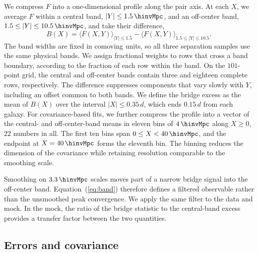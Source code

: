 We compress $F$ into a one-dimensional profile along the pair axis. At each
$X$, we average $F$ within a central band, $|Y|\leq1.5\,\hinvMpc$, and an
off-center band, $1.5\leq|Y|\leq10.5\,\hinvMpc$, and take their difference,
\begin{equation}
  B(X) = \langle F(X,Y)\rangle_{|Y|\leq1.5}
       - \langle F(X,Y)\rangle_{1.5\leq|Y|\leq10.5}.
  \label{eq:band}
\end{equation}
The band widths are fixed in comoving units, so all three separation samples
use the same physical bands. We assign fractional weights to rows that cross
a band boundary, according to the fraction of each row within the band. On
the $101$-point grid, the central and off-center bands contain three and
eighteen complete rows, respectively. The difference suppresses components
that vary slowly with $Y$, including an offset common to both bands. We
define the bridge excess as the mean of $B(X)$ over the interval
$|X|\leq0.35\,d$, which ends $0.15\,d$ from each galaxy. For
covariance-based fits, we further compress the profile into a vector of the
central- and off-center-band means in eleven bins of
$4\,\hinvMpc$ along $X\geq0$, $22$ numbers in all. The first ten bins span
$0\leq X<40\,\hinvMpc$, and the endpoint at $X=40\,\hinvMpc$ forms the
eleventh bin. The binning reduces the dimension of the covariance while
retaining resolution comparable to the smoothing scale.

Smoothing on $3.3\,\hinvMpc$ scales moves part of a narrow bridge signal into
the off-center band. Equation~(\ref{eq:band}) therefore defines a filtered
observable rather than the unsmoothed peak convergence. We apply the same
filter to the data and mock. In the mock, the ratio of the bridge statistic
to the central-band excess provides a transfer factor between the two
quantities.

\subsection{Errors and covariance}
\label{sec:errors}

